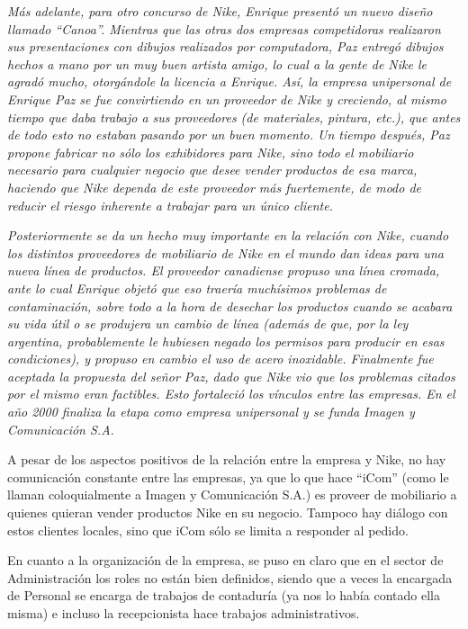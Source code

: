 \documentclass[a4paper,10pt,titlepage]{article}
\begin{document}
\textit{M\'as adelante, para otro concurso de Nike, Enrique present\'o un nuevo diseño llamado ``Canoa''.
Mientras que las otras dos empresas competidoras realizaron sus presentaciones con dibujos realizados por computadora, Paz entreg\'o dibujos hechos a mano por un muy buen artista amigo, lo cual a la gente de Nike le agrad\'o mucho, otorg\'andole la licencia a Enrique.
As\'i, la empresa unipersonal de Enrique Paz se fue convirtiendo en un proveedor de Nike y creciendo, al mismo tiempo que daba trabajo a sus proveedores (de materiales, pintura, etc.), que antes de todo esto no estaban pasando por un buen momento.
Un tiempo despu\'es, Paz propone fabricar no s\'olo los exhibidores para Nike, sino todo el mobiliario necesario para cualquier negocio que desee vender productos de esa marca, haciendo que Nike dependa de este proveedor m\'as fuertemente, de modo de reducir el riesgo inherente a trabajar para un \'unico cliente.}

\textit{Posteriormente se da un hecho muy importante en la relaci\'on con Nike, cuando los distintos proveedores de mobiliario de Nike en el mundo dan ideas para una nueva l\'inea de productos.
El proveedor canadiense propuso una l\'inea cromada, ante lo cual Enrique objet\'o que eso traer\'ia much\'isimos problemas de contaminaci\'on, sobre todo a la hora de desechar los productos cuando se acabara su vida \'util o se produjera un cambio de l\'inea (adem\'as de que, por la ley argentina, probablemente le hubiesen negado los permisos para producir en esas condiciones), y propuso en cambio el uso de acero inoxidable.
Finalmente fue aceptada la propuesta del señor Paz, dado que Nike vio que los problemas citados por el mismo eran factibles. Esto fortaleci\'o los v\'inculos entre las empresas. En el año 2000 finaliza la etapa como empresa unipersonal y se funda Imagen y Comunicaci\'on S.A.}

A pesar de los aspectos positivos de la relaci\'on entre la empresa y Nike, no hay comunicaci\'on constante entre las empresas, ya que lo que hace ``iCom'' (como le llaman coloquialmente a Imagen y Comunicaci\'on S.A.) es proveer de mobiliario a quienes quieran vender productos Nike en su negocio. Tampoco hay di\'alogo con estos clientes locales, sino que iCom s\'olo se limita a responder al pedido.

En cuanto a la organizaci\'on de la empresa, se puso en claro que en el sector de Administraci\'on los roles no est\'an bien definidos, siendo que a veces la encargada de Personal se encarga de trabajos de contadur\'ia (ya nos lo hab\'ia contado ella misma) e incluso la recepcionista hace trabajos administrativos. 
\end{document}
